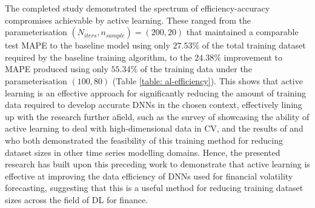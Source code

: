 \documentclass[a4paper, 11pt]{report}
\begin{document}
    The completed study demonstrated the spectrum of efficiency-accuracy compromises achievable by active learning. These ranged from the parameterisation $(N_{iters}, n_{sample}) = (200, 20)$ that maintained a comparable test MAPE to the baseline model using only $27.53\%$ of the total training dataset required by the baseline training algorithm, to the $24.38\%$ improvement to MAPE produced using only $55.34\%$ of the training data under the parameterisation $(100, 80)$ (Table \ref{table: al-efficiency}). This shows that active learning is an effective approach for significantly reducing the amount of training data required to develop accurate DNNs in the chosen context, effectively lining up with the research further afield, such as the survey of \citet{ren-2021} showcasing the ability of active learning to deal with high-dimensional data in CV, and the results of \citet{peng-2017} and \citet{zimmer-2018} who both demonstrated the feasibility of this training method for reducing dataset sizes in other time series modelling domains. Hence, the presented research has built upon this preceding work to demonstrate that active learning is effective at improving the data efficiency of DNNs used for financial volatility forecasting, suggesting that this is a useful method for reducing training dataset sizes across the field of DL for finance.
\end{document}
